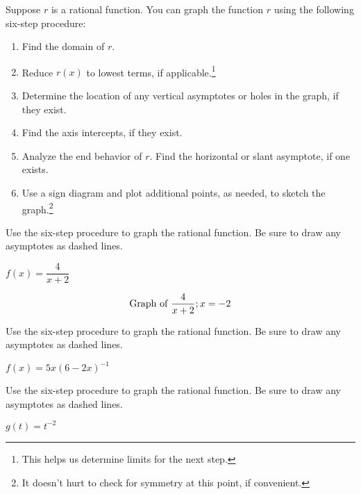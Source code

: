 \documentclass{ximera}
\begin{document}
	\author{Stitz-Zeager}


Suppose $r$ is a rational function.  You can graph the function $r$ using the following six-step procedure:

\begin{enumerate}

\item  Find the domain of $r$.

\item  Reduce $r(x)$ to lowest terms, if applicable.\footnote{This helps us determine limits for the next step.}

\item  Determine the location of any vertical asymptotes or holes in the graph, if they exist. 

\item  Find the axis intercepts, if they exist.

\item  Analyze the end behavior of $r$.  Find the horizontal or slant asymptote, if one exists.

\item  Use a sign diagram and plot additional points, as needed, to sketch the graph.\footnote{It doesn't hurt to check for symmetry at this point, if convenient.}

\end{enumerate}

\begin{problem}\label{sixstepfirst}
Use the six-step procedure
to graph the rational function.  Be sure to draw any asymptotes as dashed lines.

$f(x) = \dfrac{4}{x + 2}$

\begin{solution}
\[
\graph[xmin=-7, xmax=5, ymin=-5, ymax=5]{\frac{4}{x+2};x=-2}
\]
\end{solution}
\end{problem}

\begin{problem}
Use the six-step procedure
to graph the rational function.  Be sure to draw any asymptotes as dashed lines.

$f(x) = 5x(6-2x)^{-1}$ 
\end{problem}  

\begin{problem}
Use the six-step procedure
to graph the rational function.  Be sure to draw any asymptotes as dashed lines.

$g(t) = t^{-2}$
\end{problem} 
\end{document}
